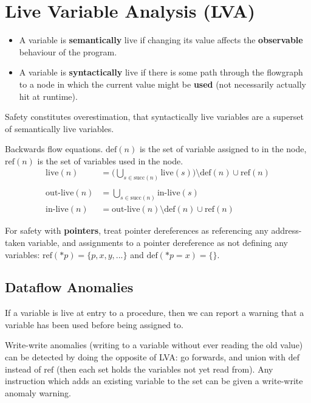 \documentclass[a4paper, 11pt]{article}
\begin{document}
\section*{Live Variable Analysis (LVA)}
{
    \begin{itemize}
    \item A variable is \textbf{semantically} live if changing its value affects the \textbf{observable} behaviour of the program.
    \item A variable is \textbf{syntactically} live if there is some path through the flowgraph to a node in which the current value might be \textbf{used} (not necessarily actually hit at runtime).
    \end{itemize}

    Safety constitutes overestimation, that syntactically live variables are a superset of semantically live variables.

    Backwards flow equations. \(\text{def}(n)\) is the set of variable assigned to in the node, \(\text{ref}(n)\) is the set of variables used in the node.
    \begin{align*}
    \text{live}(n) &= \bigg(\bigcup_{s \in \text{succ}(n)}{\text{live}(s)}\bigg) \setminus \text{def}(n) \cup \text{ref}(n) \\\\
    \text{out-live}(n) &= \bigcup_{s \in \text{succ}(n)}{\text{in-live}(s)} \\
    \text{in-live}(n) &= \text{out-live}(n) \setminus \text{def}(n) \cup \text{ref}(n)
    \end{align*}

    For safety with \textbf{pointers}, treat pointer dereferences as referencing any address-taken variable, and assignments to a pointer dereference as not defining any variables: \(\text{ref}(*p) = \{p, x, y, ...\}\) and \(\text{def}(*p = x) = \{\}\).

    \subsection*{Dataflow Anomalies}
    {
        If a variable is live at entry to a procedure, then we can report a warning that a variable has been used before being assigned to.

        Write-write anomalies (writing to a variable without ever reading the old value) can be detected by doing the opposite of LVA: go forwards, and union with \(\text{def}\) instead of \(\text{ref}\) (then each set holds the variables not yet read from). Any instruction which adds an existing variable to the set can be given a write-write anomaly warning.
    }
}
\end{document}
